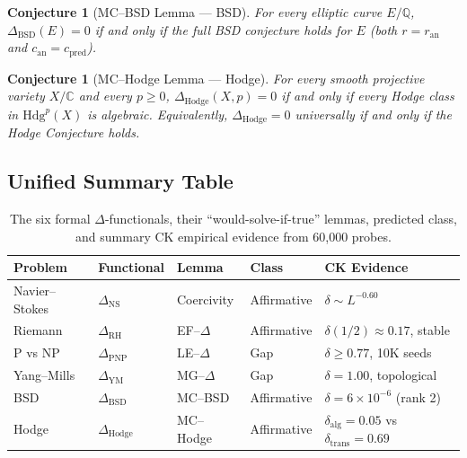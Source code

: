 \documentclass[11pt]{article}
\newtheorem{conjecture}[theorem]{Conjecture}
\begin{document}
\begin{conjecture}[MC--BSD Lemma --- BSD]
\label{conj:bsd}
For every elliptic curve $E / \mathbb{Q}$,
$\Delta_{\mathrm{BSD}}(E) = 0$ if and only if the full BSD
conjecture holds for $E$ (both $r = r_{\mathrm{an}}$ and
$c_{\mathrm{an}} = c_{\mathrm{pred}}$).
\end{conjecture}

\begin{conjecture}[MC--Hodge Lemma --- Hodge]
\label{conj:hodge}
For every smooth projective variety $X / \mathbb{C}$ and every
$p \geq 0$, $\Delta_{\mathrm{Hodge}}(X, p) = 0$ if and only if
every Hodge class in $\mathrm{Hdg}^p(X)$ is algebraic.
Equivalently, $\Delta_{\mathrm{Hodge}} = 0$ universally if and
only if the Hodge Conjecture holds.
\end{conjecture}

\subsection{Unified Summary Table}
\label{subsec:unified-summary}

\begin{table}[h!]
\centering
\small
\begin{tabular}{@{}lllll@{}}
\toprule
\textbf{Problem} & \textbf{Functional} & \textbf{Lemma} & \textbf{Class} & \textbf{CK Evidence} \\
\midrule
Navier--Stokes & $\Delta_{\mathrm{NS}}$ & Coercivity & Affirmative & $\delta \sim L^{-0.60}$ \\
Riemann & $\Delta_{\mathrm{RH}}$ & EF--$\Delta$ & Affirmative & $\delta(1/2) \approx 0.17$, stable \\
P vs NP & $\Delta_{\mathrm{PNP}}$ & LE--$\Delta$ & Gap & $\delta \geq 0.77$, 10K seeds \\
Yang--Mills & $\Delta_{\mathrm{YM}}$ & MG--$\Delta$ & Gap & $\delta = 1.00$, topological \\
BSD & $\Delta_{\mathrm{BSD}}$ & MC--BSD & Affirmative & $\delta = 6 \times 10^{-6}$ (rank 2) \\
Hodge & $\Delta_{\mathrm{Hodge}}$ & MC--Hodge & Affirmative & $\delta_{\mathrm{alg}} = 0.05$ vs $\delta_{\mathrm{trans}} = 0.69$ \\
\bottomrule
\end{tabular}
\caption{The six formal $\Delta$-functionals, their ``would-solve-if-true'' lemmas,
predicted class, and summary CK empirical evidence from 60,000 probes.}
\label{tab:unified-deltas}
\end{table}
\end{document}
